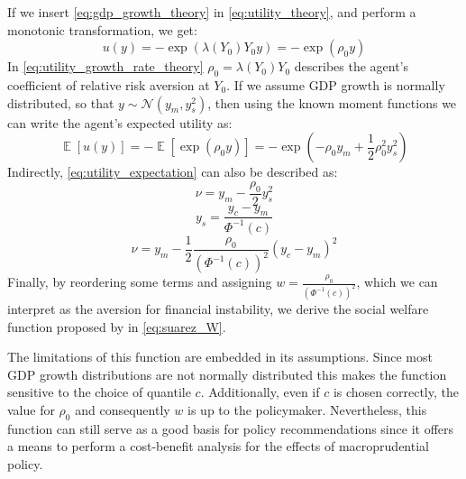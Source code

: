 \documentclass[12pt,a4paper]{article}
\begin{document}
If we insert \autoref{eq:gdp_growth_theory} in \autoref{eq:utility_theory}, and perform a monotonic transformation, we get:
\begin{equation}
    \label{eq:utility_growth_rate_theory}
    u(y) = -\exp{\left(\lambda(Y_0)Y_0y\right)} = -\exp{\left(\rho_0 y\right)}
\end{equation}
In \autoref{eq:utility_growth_rate_theory} $\rho_0=\lambda(Y_0)Y_0$ describes the agent's coefficient of relative risk aversion at $Y_0$. If we assume GDP growth is normally distributed, so that $y\sim\mathcal{N}(y_m,y_s^2)$, then using the known moment functions we can write the agent's expected utility as:
\begin{equation}
    \label{eq:utility_expectation}
    \mathop{\mathbb{E}}\left[u(y)\right] =  -\mathop{\mathbb{E}}\left[\exp{\left(\rho_0 y\right)}\right] = -\exp{\left(-\rho_0 y_m + \frac{1}{2}\rho_0^2 y_s^2 \right)}
\end{equation}
Indirectly, \autoref{eq:utility_expectation} can also be described as: 
\begin{equation}
    \nu = y_m - \frac{\rho_0}{2}y_s^2 
\end{equation}
\begin{equation}
    y_s = \frac{y_c-y_m}{\Phi^{-1}(c)}
\end{equation}
\begin{equation}
    \nu = y_m - \frac{1}{2}\frac{\rho_0}{\left(\Phi^{-1}(c)\right)^2} (y_c - y_m)^2 
\end{equation}
Finally, by reordering some terms and assigning $w=\frac{\rho_0}{\left(\Phi^{-1}(c)\right)^2}$, which we can interpret as the aversion for financial instability, we derive the social welfare function proposed by \citet{suarez2022} in \autoref{eq:suarez_W}.

The limitations of this function are embedded in its assumptions. Since most GDP growth distributions are not normally distributed this makes the function sensitive to the choice of quantile $c$. Additionally, even if $c$ is chosen correctly, the value for $\rho_0$ and consequently $w$ is up to the policymaker. Nevertheless, this function can still serve as a good basis for policy recommendations since it offers a means to perform a cost-benefit analysis for the effects of macroprudential policy.
\end{document}

